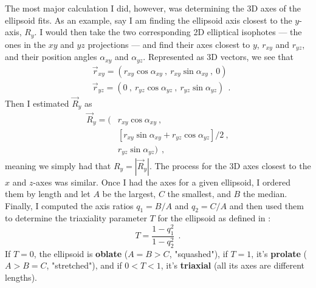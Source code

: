 \documentclass[twocolumn]{aastex631}
\begin{document}
The most major calculation I did, however, was determining the 3D axes of the ellipsoid fits.
As an example, say I am finding the ellipsoid axis closest to the $y$-axis, $R_y$.
I would then take the two corresponding 2D elliptical isophotes --- the ones in the $xy$ and $yz$ projections --- and find their axes closest to $y$, $r_{xy}$ and $r_{yz}$, and their position angles $\alpha_{xy}$ and $\alpha_{yz}$.
Represented as 3D vectors, we see that
\begin{equation}
\begin{split}  
    & \vec{r}_{xy} = (r_{xy}\cos\alpha_{xy} \ , \ r_{xy}\sin\alpha_{xy} \ , \ 0) 
    \\ 
    & \vec{r}_{yz} = (0 \ , \ r_{yz}\cos\alpha_{yz} \ , \ r_{yz}\sin\alpha_{yz}) \ \ .
\end{split}
\end{equation}
Then I estimated $\vec{R}_y$ as
\begin{equation}
\begin{split}
    \vec{R}_y = (&r_{xy}\cos\alpha_{xy} \ , 
    \\ &  [r_{xy}\sin\alpha_{xy} + r_{yz}\cos\alpha_{yz}]/2 \ ,
    \\ & r_{yz}\sin\alpha_{yz}\textbf{}) \ \ ,
\end{split}
\end{equation}
meaning we simply had that $R_y = |\vec{R}_y|$.
The process for the 3D axes closest to the $x$ and $z$-axes was similar.
Once I had the axes for a given ellipsoid, I ordered them by length and let $A$ be the largest, $C$ the smallest, and $B$ the median.
Finally, I computed the axis ratios $q_1 = B/A$ and $q_2 = C/A$ and then used them to determine the triaxiality parameter $T$ for the ellipsoid as defined in \cite{Quenneville+2022}:
\begin{equation} \label{eq:triax}
    T = \frac{1-q_1^2}{1-q_2^2} \ \ .
\end{equation}
If $T=0$, the ellipsoid is \textbf{oblate} ($A=B>C$, "squashed"), if $T=1$, it's \textbf{prolate} ($A>B=C$, "stretched"), and if $0<T<1$, it's \textbf{triaxial} (all its axes are different lengths).
\end{document}
